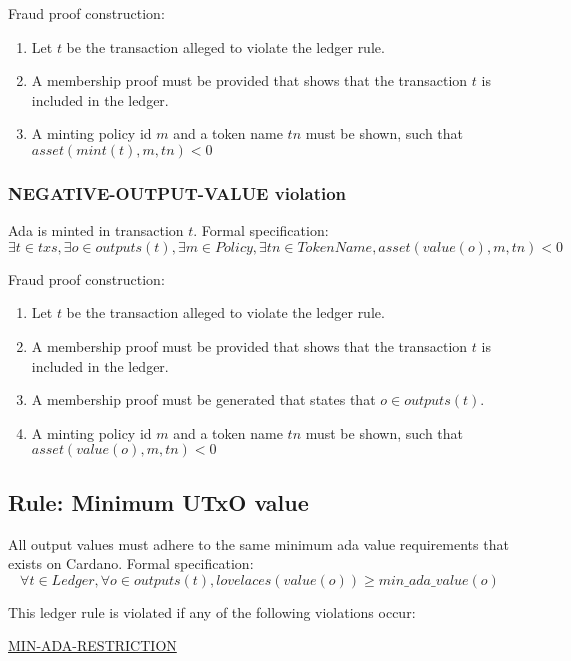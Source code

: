 \documentclass[../midgard.tex]{subfiles}
\begin{document}
Fraud proof construction:
\begin{enumerate}
  \item Let $t$ be the transaction alleged to violate the ledger rule.
  \item A membership proof must be provided that shows that the transaction $t$ is included in the ledger.
  \item A minting policy id $m$ and a token name $tn$ must be shown, such that $asset(mint(t), m, tn) < 0$
\end{enumerate}

\subsubsection{NEGATIVE-OUTPUT-VALUE violation}
\label{violation:NEGATIVE-OUTPUT-VALUE}
Ada is minted in transaction $t$.
Formal specification:
\begin{equation*}
  \exists t \in txs, \exists o \in outputs(t), \exists m \in Policy, \exists tn \in TokenName, asset(value(o), m, tn) < 0
\end{equation*}

Fraud proof construction:
\begin{enumerate}
  \item Let $t$ be the transaction alleged to violate the ledger rule.
  \item A membership proof must be provided that shows that the transaction $t$ is included in the ledger.
  \item A membership proof must be generated that states that $o \in outputs(t)$.
  \item A minting policy id $m$ and a token name $tn$ must be shown, such that $asset(value(o), m, tn) < 0$
\end{enumerate}

\subsection{Rule: Minimum UTxO value}
\label{rule:minimum-utxo-value}
All output values must adhere to the same minimum ada value requirements that exists on Cardano.
Formal specification:
\begin{equation*}
    \forall t \in Ledger, \forall o \in outputs(t), lovelaces(value(o)) \geq min\_ada\_value(o)
\end{equation*}

\todo

This ledger rule is violated if any of the following violations occur:
\begin{itemize-multi}
  \item \hyperref[violation:MIN-ADA-RESTRICTION]{MIN-ADA-RESTRICTION}
\end{itemize-multi}
\end{document}
